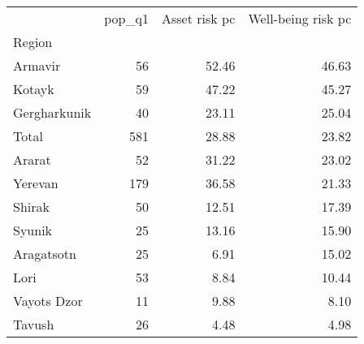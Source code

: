 \begin{tabular}{lrrr}
\toprule
{} &  pop\_q1 &  Asset risk pc &  Well-being risk pc \\
Region       &         &                &                     \\
\midrule
Armavir      &      56 &          52.46 &               46.63 \\
Kotayk       &      59 &          47.22 &               45.27 \\
Gergharkunik &      40 &          23.11 &               25.04 \\
Total        &     581 &          28.88 &               23.82 \\
Ararat       &      52 &          31.22 &               23.02 \\
Yerevan      &     179 &          36.58 &               21.33 \\
Shirak       &      50 &          12.51 &               17.39 \\
Syunik       &      25 &          13.16 &               15.90 \\
Aragatsotn   &      25 &           6.91 &               15.02 \\
Lori         &      53 &           8.84 &               10.44 \\
Vayots Dzor  &      11 &           9.88 &                8.10 \\
Tavush       &      26 &           4.48 &                4.98 \\
\bottomrule
\end{tabular}
